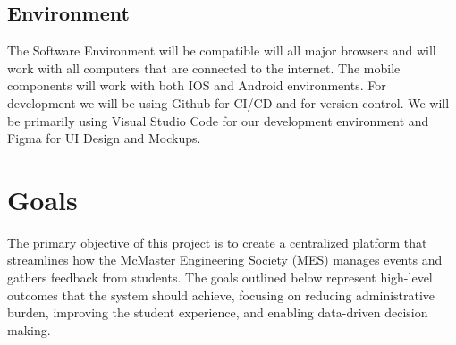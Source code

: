 \documentclass{article}
\begin{document}
\subsection{Environment}
The Software Environment will be compatible will all major browsers and will work with all computers that are connected to the internet. The mobile components will work with both IOS and Android environments. For development we will be using Github for CI/CD and for version control. We will be primarily using Visual Studio Code for our development environment and Figma for UI Design and Mockups.

\section{Goals}
The primary objective of this project is to create a centralized platform that streamlines how the McMaster Engineering Society (MES) manages events and gathers feedback from students. The goals outlined below represent high-level outcomes that the system should achieve, focusing on reducing administrative burden, improving the student experience, and enabling data-driven decision making.
\end{document}
